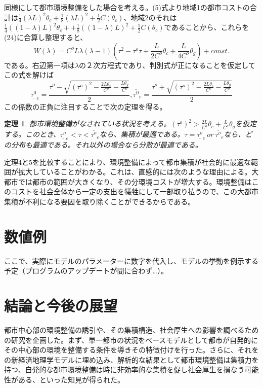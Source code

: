 \documentclass[a4paper]{jarticle}
\newtheorem{teiri}{定理}
\begin{document}
同様にして都市環境整備をした場合を考える。(5)式より地域1の都市コストの合計は$\frac{1}{4}(\lambda L)^2 \theta_c + \frac{1}{8}(\lambda L)^2 + \frac{1}{2}C(\theta_c)$、地域2のそれは$\frac{1}{4}((1 - \lambda) L)^2 \theta_c +  + \frac{1}{8}((1 - \lambda )L)^2 + \frac{1}{2}C(\theta_c)$であることから、これらを(24)に合算し整理すると、
\begin{equation}
W(\lambda) = C^o L \lambda (\lambda - 1) (\tau^2 - \tau^o \tau + \frac{L}{2C^o}\theta_c + \frac{L}{4C^o}\theta_g) + const.
\end{equation}
である。右辺第一項は$\lambda$の２次方程式であり、判別式が正になることを仮定してこの式を解けば
\begin{equation}
\underline{\tau^0}_e = \frac{\tau^o - \sqrt{(\tau^o)^2 - \frac{2L\theta_c}{C^o} - \frac{L \theta_g}{C^o} }}{2} , \overline{\tau^0}_e = \frac{\tau^o + \sqrt{(\tau^o)^2 - \frac{2L\theta_c}{ C^o} - \frac{L \theta_g}{C^o} }}{2}
\end{equation}
この係数の正負に注目することで次の定理を得る。

\begin{teiri}
都市環境整備がなされている状況を考える。$(\tau^o)^2 > \frac{2L}{C^o}\theta_c + \frac{L}{C^o}\theta_g$を仮定する。このとき、$\underline{\tau^o}_e < \tau < \overline{\tau^o}_e$なら、集積が最適である。$\tau = \underline{\tau^o}_e\ or \ \overline{\tau^o}_e$なら、どの分布も最適である。それ以外の場合なら分散が最適である。
\end{teiri}

定理4と5を比較することにより、環境整備によって都市集積が社会的に最適な範囲が拡大していることがわかる。これは、直感的には次のような理由による。大都市では都市の範囲が大きくなり、その分環境コストが増大する。環境整備はこのコストを社会全体から一定の支出を犠牲にして一部取り払うので、この大都市集積が不利になる要因を取り除くことができるからである。

\section{数値例}
ここで、実際にモデルのパラメーターに数字を代入し、モデルの挙動を例示する予定（プログラムのアップデートが間に合わず…）。

\section{結論と今後の展望}
都市中心部の環境整備の誘引や、その集積構造、社会厚生への影響を調べるための研究を企画した。まず、単一都市の状況をベースモデルとして都市が自発的にその中心部の環境を整備する条件を導きその特徴付けを行った。さらに、それを\citet{ottaviano02:aggl}の新経済地理学モデルに埋め込み、解析的な結果として都市環境整備は集積力を持つ、自発的な都市環境整備は時に非効率的な集積を促し社会厚生を損なう可能性がある、といった知見が得られた。
\end{document}
